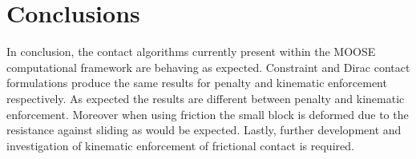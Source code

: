 \documentclass[]{article}
\begin{document}
\section{Conclusions}
\label{conclusions}

\noindent In conclusion, the contact algorithms currently present within the MOOSE computational framework are behaving as expected.  Constraint and Dirac contact formulations produce the same results for penalty and kinematic enforcement respectively.  As expected the results are different between penalty and kinematic enforcement.  Moreover when using friction the small block is deformed due to the resistance against sliding as would be expected.  Lastly, further development and investigation of kinematic enforcement of frictional contact is required.
\end{document}
